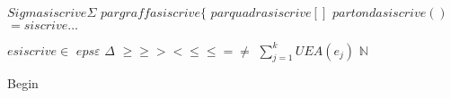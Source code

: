 \documentclass[a4paper,10pt]{article}
\begin{document}
$Sigma si scrive \Sigma$
$par graffa si scrive \{$
$par quadra si scrive []$
$par tonda si scrive ()$
$= si scrive \dots$

$e si scrive \in$
$eps \varepsilon$
$\Delta$
$\ge\geq><\le\leq=\neq$
$\sum_{j=1}^k UEA(e_j)$
$\mathbb{N}$
\begin{algorithm}
Begin
\end{algorithm}
\end{document}
